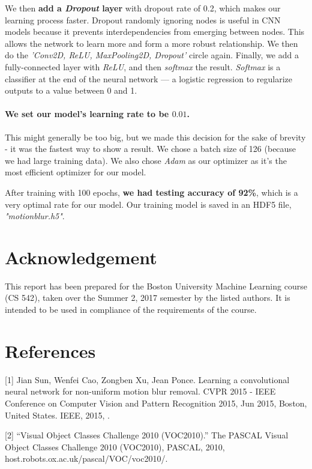 \documentclass{article}
\begin{document}
We then \textbf{add a \textit{Dropout} layer} with dropout rate of 0.2, which makes our 
learning process faster. Dropout randomly ignoring nodes is useful in CNN models because 
it prevents interdependencies from emerging between nodes. This allows the network to learn 
more and form a more robust relationship. We then do the \textit{'Conv2D, ReLU, 
MaxPooling2D, Dropout'} circle again. Finally, we add a fully-connected layer with 
\textit{ReLU}, and then \textit{softmax} the result. \textit{Softmax} is a classifier at 
the end of the neural network — a logistic regression to regularize outputs to a value 
between 0 and 1. 

\paragraph{We set our model's learning rate to be $0.01$.} This might generally be too 
big, but we made this decision for the sake of brevity - it was the fastest way to show 
a result. We chose a batch size of 126 (because we had large training data). We also 
chose \textit{Adam} as our optimizer as it's the most efficient optimizer for our model.

After training with 100 epochs, \textbf{we had testing accuracy of 92\%}, which is a 
very optimal rate for our model. Our training model is saved in an HDF5 file, 
\textit{"motionblur.h5"}.  

\section*{Acknowledgement}
This report has been prepared for the Boston University Machine Learning course (CS 542), 
taken over the Summer 2, 2017 semester by the listed authors. It is intended to be used 
in compliance of the requirements of the course. 

\section*{References}
\medskip
\small

[1] Jian Sun, Wenfei Cao, Zongben Xu, Jean Ponce. Learning a convolutional neural network 
for non-uniform motion blur removal. CVPR 2015 - IEEE Conference on Computer Vision and 
Pattern Recognition 2015, Jun 2015, Boston, United States. IEEE, 2015, .

[2] “Visual Object Classes Challenge 2010 (VOC2010).” The PASCAL Visual Object Classes 
Challenge 2010 (VOC2010), PASCAL, 2010, host.robots.ox.ac.uk/pascal/VOC/voc2010/.
\end{document}
